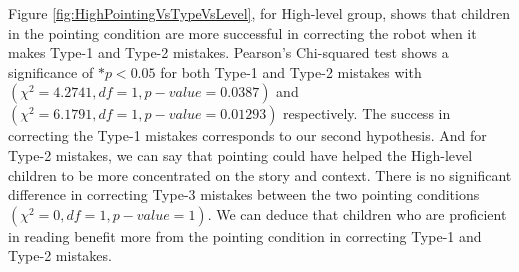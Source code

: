 \documentclass{sigchi}
\begin{document}
Figure \ref{fig:HighPointingVsTypeVsLevel}, for High-level group, shows that children in the pointing condition are more successful in correcting the robot when it makes Type-1 and Type-2 mistakes.
Pearson's Chi-squared test shows a significance of $*p<0.05$ for both Type-1 and Type-2 mistakes with $(\chi^2 = 4.2741, df = 1, p-value = 0.0387)$ and $(\chi^2 = 6.1791, df = 1, p-value = 0.01293)$ respectively.
The success in correcting the Type-1 mistakes corresponds to our second hypothesis.
And for Type-2 mistakes, we can say that pointing could have helped the High-level children to be more concentrated on the story and context. 
There is no significant difference in correcting Type-3 mistakes between the two pointing conditions $(\chi^2 = 0, df = 1, p-value = 1)$.
We can deduce that children who are proficient in reading benefit more from the pointing condition in correcting Type-1 and Type-2 mistakes. 
\end{document}
